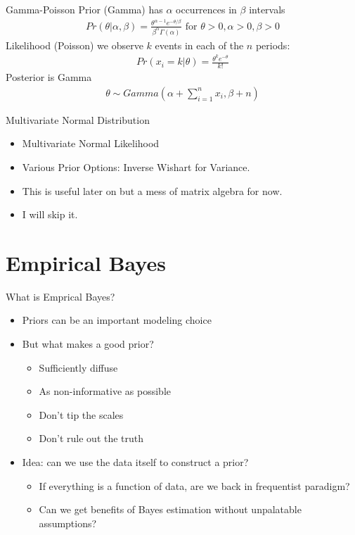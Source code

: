\documentclass[aspectratio=169]{beamer}
\begin{document}
\begin{frame}{Gamma-Poisson}
Prior (Gamma) has $\alpha$ occurrences in $\beta$ intervals
\begin{align*}
Pr(\theta | \alpha, \beta)=\frac{\theta^{\alpha-1} e^{-\theta / \beta}}{\beta^{\alpha} \Gamma(\alpha)} \text { for } \theta>0, \alpha>0, \beta>0
\end{align*}
Likelihood (Poisson) we observe $k$ events in each of the $n$ periods:
\begin{align*}
Pr(x_i=k | \theta )= \frac{\theta^{k} e^{-\theta}}{k !}
\end{align*}
Posterior is \alert{Gamma}
\begin{align*}
\theta \sim Gamma(\alpha + \sum_{i=1}^n x_i, \beta + n)
\end{align*}

\end{frame}


\begin{frame}{Multivariate Normal Distribution}
\begin{itemize}
\item Multivariate Normal Likelihood
\item Various Prior Options: Inverse Wishart for Variance.
\item This is useful later on but a mess of matrix algebra for now.
\item I will skip it.
\end{itemize}
\end{frame}

\section{Empirical Bayes}
\begin{frame}{What is Emprical Bayes?}
\begin{itemize}
\item Priors can be an important modeling choice
\item But what makes a good prior?
\begin{itemize}
\item Sufficiently diffuse
\item As non-informative as possible
\item Don't tip the scales
\item Don't rule out the truth
\end{itemize}
\item Idea: can we use the data itself to construct a prior?
\begin{itemize}
\item If everything is a function of data, are we back in frequentist paradigm?
\item Can we get benefits of Bayes estimation without unpalatable assumptions?
\end{itemize}
\end{itemize}

\end{frame}
\end{document}
